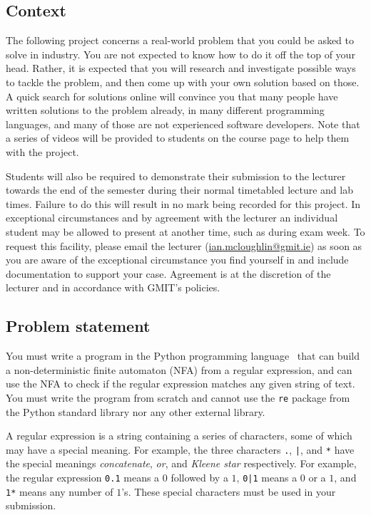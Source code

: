 \documentclass[12pt, a4paper]{article}
\begin{document}
\subsection*{Context}
The following project concerns a real-world problem that you could be asked to solve in industry.
You are not expected to know how to do it off the top of your head.
Rather, it is expected that you will research and investigate possible ways to tackle the problem, and then come up with your own solution based on those.
A quick search for solutions online will convince you that many people have written solutions to the problem already, in many different programming languages, and many of those are not experienced software developers.
Note that a series of videos will be provided to students on the course page to help them with the project.

Students will also be required to demonstrate their submission to the lecturer towards the end of the semester during their normal timetabled lecture and lab times.
Failure to do this will result in no mark being recorded for this project.
In exceptional circumstances and by agreement with the lecturer an individual student may be allowed to present at another time, such as during exam week.
To request this facility, please email the lecturer (\url{ian.mcloughlin@gmit.ie}) as soon as you are aware of the exceptional circumstance you find yourself in and include documentation to support your case.
Agreement is at the discretion of the lecturer and in accordance with GMIT's policies.

\subsection*{Problem statement}
You must write a program in the Python programming language~\cite{python} that can build a non-deterministic finite automaton (NFA) from a regular expression, and can use the NFA to check if the regular expression matches any given string of text.
You must write the program from scratch and cannot use the \texttt{re} package from the Python standard library nor any other external library.

A regular expression is a string containing a series of characters, some of which may have a special meaning.
For example, the three characters \texttt{.},  \texttt{|}, and \texttt{*} have the special meanings \emph{concatenate}, \emph{or}, and \emph{Kleene star} respectively.
For example, the regular expression \texttt{0.1} means a $0$ followed by a $1$, \texttt{0|1} means a $0$ or a $1$, and \texttt{1*} means any number of $1$'s.
These special characters must be used in your submission.
\end{document}
